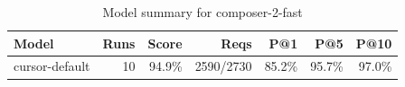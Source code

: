 \begin{table}[htbp]
\centering
\begin{tabular}{lrrrrrr}
\toprule
Model & Runs & Score & Reqs & P@1 & P@5 & P@10 \\
\midrule
cursor-default & 10 & 94.9\% & 2590/2730 & 85.2\% & 95.7\% & 97.0\% \\
\bottomrule
\end{tabular}
\caption{Model summary for composer-2-fast}
\end{table}
